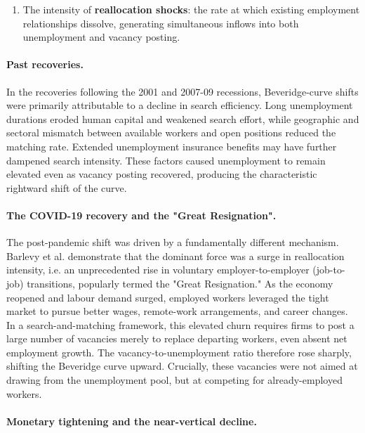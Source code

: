 \documentclass[dvipsnames,11pt]{article}
\begin{document}
\begin{enumerate}
\begin{solution}
\begin{enumerate}
                        \item The intensity of \textbf{reallocation shocks}: the rate at which existing employment relationships dissolve, generating simultaneous inflows into both unemployment and vacancy posting.
                    \end{enumerate}

                    \paragraph{Past recoveries.}

                        In the recoveries following the 2001 and 2007-09 recessions, Beveridge-curve shifts were primarily attributable to a decline in search efficiency. Long unemployment durations eroded human capital and weakened search effort, while geographic and sectoral mismatch between available workers and open positions reduced the matching rate. Extended unemployment insurance benefits may have further dampened search intensity. These factors caused unemployment to remain elevated even as vacancy posting recovered, producing the characteristic rightward shift of the curve.

                    \paragraph{The COVID-19 recovery and the "Great Resignation".}

                        The post-pandemic shift was driven by a fundamentally different mechanism. Barlevy et al. demonstrate that the dominant force was a surge in reallocation intensity, i.e. an unprecedented rise in voluntary employer-to-employer (job-to-job) transitions, popularly termed the "Great Resignation." As the economy reopened and labour demand surged, employed workers leveraged the tight market to pursue better wages, remote-work arrangements, and career changes. In a search-and-matching framework, this elevated churn requires firms to post a large number of vacancies merely to replace departing workers, even absent net employment growth. The vacancy-to-unemployment ratio therefore rose sharply, shifting the Beveridge curve upward. Crucially, these vacancies were not aimed at drawing from the unemployment pool, but at competing for already-employed workers.

                    \paragraph{Monetary tightening and the near-vertical decline.}


\end{solution}
\end{enumerate}
\end{document}
